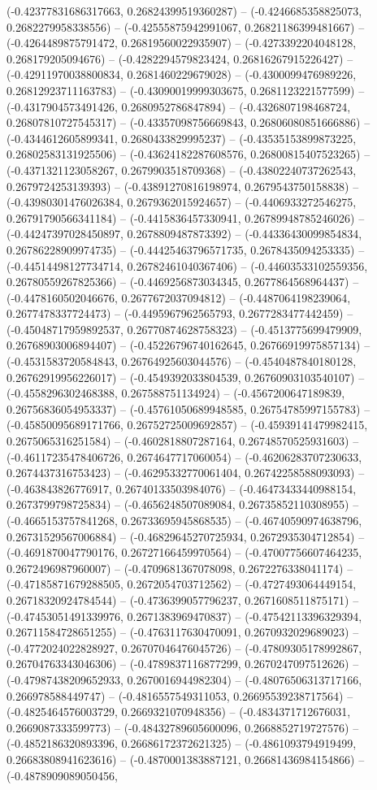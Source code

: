 (-0.42377831686317663, 0.26824399519360287) -- (-0.4246685358825073, 0.2682279958338556) -- (-0.42555875942991067, 0.26821186399481667) -- (-0.4264489875791472, 0.26819560022935907) -- (-0.4273392204048128, 0.268179205094676) -- (-0.4282294579823424, 0.26816267915226427) -- (-0.42911970038800834, 0.2681460229679028) -- (-0.4300099476989226, 0.26812923711163783) -- (-0.43090019999303675, 0.2681123221577599) -- (-0.4317904573491426, 0.2680952786847894) -- (-0.4326807198468724, 0.26807810727545317) -- (-0.43357098756669843, 0.26806080851666886) -- (-0.4344612605899341, 0.2680433829995237) -- (-0.43535153899873225, 0.26802583131925506) -- (-0.43624182287608576, 0.26800815407523265) -- (-0.4371321123058267, 0.2679903518709368) -- (-0.43802240737262543, 0.2679724253139393) -- (-0.43891270816198974, 0.2679543750158838) -- (-0.43980301476026384, 0.2679362015924657) -- (-0.4406933272546275, 0.26791790566341184) -- (-0.4415836457330941, 0.26789948785246026) -- (-0.44247397028450897, 0.2678809487873392) -- (-0.44336430099854834, 0.26786228909974735) -- (-0.44425463796571735, 0.2678435094253335) -- (-0.44514498127734714, 0.26782461040367406) -- (-0.44603533102559356, 0.26780559267825366) -- (-0.4469256873034345, 0.2677864568964437) -- (-0.4478160502046676, 0.2677672037094812) -- (-0.4487064198239064, 0.2677478337724473) -- (-0.4495967962565793, 0.2677283477442459) -- (-0.45048717959892537, 0.26770874628758323) -- (-0.4513775699479909, 0.26768903006894407) -- (-0.45226796740162645, 0.26766919975857134) -- (-0.4531583720584843, 0.26764925603044576) -- (-0.4540487840180128, 0.26762919956226017) -- (-0.4549392033804539, 0.26760903103540107) -- (-0.4558296302468388, 0.267588751134924) -- (-0.4567200647189839, 0.26756836054953337) -- (-0.45761050689948585, 0.26754785997155783) -- (-0.45850095689171766, 0.26752725009692857) -- (-0.45939141479982415, 0.2675065316251584) -- (-0.4602818807287164, 0.26748570525931603) -- (-0.46117235478406726, 0.2674647717060054) -- (-0.46206283707230633, 0.2674437316753423) -- (-0.46295332770061404, 0.26742258588093093) -- (-0.463843826776917, 0.26740133503984076) -- (-0.46473433440988154, 0.2673799798725834) -- (-0.4656248507089084, 0.26735852110308955) -- (-0.4665153757841268, 0.26733695945868535) -- (-0.46740590974638796, 0.26731529567006884) -- (-0.46829645270725934, 0.2672935304712854) -- (-0.4691870047790176, 0.26727166459970564) -- (-0.47007756607464235, 0.2672496987960007) -- (-0.4709681367078098, 0.2672276338041174) -- (-0.47185871679288505, 0.2672054703712562) -- (-0.4727493064449154, 0.26718320924784544) -- (-0.4736399057796237, 0.2671608511875171) -- (-0.47453051491339976, 0.2671383969470837) -- (-0.47542113396329394, 0.26711584728651255) -- (-0.4763117630470091, 0.2670932029689023) -- (-0.4772024022828927, 0.26707046476045726) -- (-0.47809305178992867, 0.26704763343046306) -- (-0.4789837116877299, 0.2670247097512626) -- (-0.47987438209652933, 0.2670016944982304) -- (-0.48076506313717166, 0.266978588449747) -- (-0.4816557549311053, 0.26695539238717564) -- (-0.4825464576003729, 0.2669321070948356) -- (-0.4834371712676031, 0.2669087333599773) -- (-0.48432789605600096, 0.2668852719727576) -- (-0.4852186320893396, 0.26686172372621325) -- (-0.4861093794919499, 0.26683808941623616) -- (-0.4870001383887121, 0.26681436984154866) -- (-0.4878909089050456, 